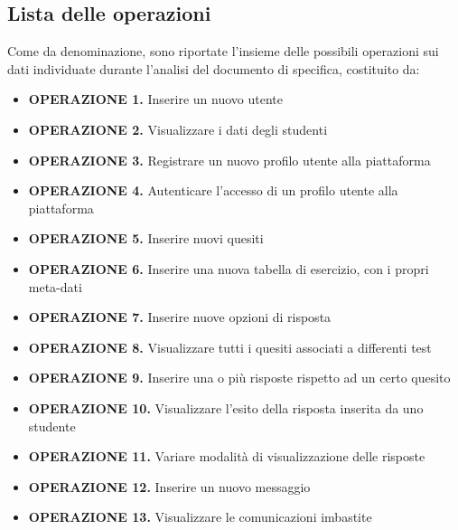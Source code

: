 \documentclass{article}
\begin{document}
\subsection{Lista delle operazioni}
\large
Come da denominazione, sono riportate l'insieme delle possibili operazioni sui dati individuate durante l'analisi del documento di specifica, costituito da: 
\begin{itemize}[label={-}]
    \itemsep1px
    \item {\small\bf{OPERAZIONE 1.}} \hspace*{1px} Inserire un nuovo utente
    \item {\small\bf{OPERAZIONE 2.}} \hspace*{1px} Visualizzare i dati degli studenti 
    \item {\small\bf{OPERAZIONE 3.}} \hspace*{1px} Registrare un nuovo profilo utente alla piattaforma 
    \item {\small\bf{OPERAZIONE 4.}} \hspace*{1px} Autenticare l'accesso di un profilo utente alla piattaforma
    \item {\small\bf{OPERAZIONE 5.}} \hspace*{1px} Inserire nuovi quesiti 
    \item {\small\bf{OPERAZIONE 6.}} \hspace*{1px} Inserire una nuova tabella di esercizio, con i propri meta-dati 
    \item {\small\bf{OPERAZIONE 7.}} \hspace*{1px} Inserire nuove opzioni di risposta
    \item {\small\bf{OPERAZIONE 8.}} \hspace*{1px} Visualizzare tutti i quesiti associati a differenti test 
    \item {\small\bf{OPERAZIONE 9.}} \hspace*{1px} Inserire una o più risposte rispetto ad un certo quesito 
    \item {\small\bf{OPERAZIONE 10.}} Visualizzare l'esito della risposta inserita da uno studente
    \item {\small\bf{OPERAZIONE 11.}} Variare modalità di visualizzazione delle risposte
    \item {\small\bf{OPERAZIONE 12.}} Inserire un nuovo messaggio 
    \item {\small\bf{OPERAZIONE 13.}} Visualizzare le comunicazioni imbastite
\end{itemize}
\end{document}
